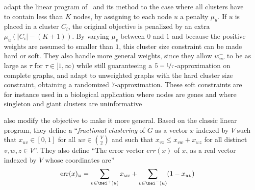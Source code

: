 \Textcite{Puleo2014} adapt the linear program of~\autocite{Charikar2003} and its \regionGrow{}
method to the case
where all clusters have to contain less than $K$ nodes, by assigning to each node $u$ a penalty
$\mu_u$. If $u$ is placed in a cluster $C_i$, the original \mind{} objective is penalized by an
extra $\mu_u\left(|C_i| - (K+1)\right)$. By varying $\mu_v$ between $0$ and $1$ and because the
positive weights are assumed to smaller than $1$, this cluster size constraint can be made hard or
soft. They also handle more general weights, since they allow $w^-_{uv}$ to be as large as $\tau$
for $\tau\in [1,\infty)$ while still guaranteeing a $5-\nicefrac{1}{\tau}$-approximation on complete
graphs, and adapt \ccpivot{} to unweighted graphs with the hard cluster size constraint, obtaining a
randomized $7$-approximation.
These soft constraints are for instance used in a biological application where nodes are genes and
where singleton and giant clusters are uninformative~\autocite{Hou2016}

\Textcite{pmlr-v48-puleo16} also modify the \mind{} objective to make it more general. Based on the
classic \pcc{} linear program, they define a \enquote{\emph{fractional clustering} of $G$ as a
vector $x$ indexed by $V$ such that $x_{uv} \in [0, 1]$ for all $uv \in \binom{V}{2}$ and such that
$x_{vz} \leq x_{vw} + x_{wz}$ for all distinct $v, w, z \in V$}. They also define \enquote{The
error vector $err(x)$ of $x$, as a real vector indexed by $V$ whose coordinates are}
\begin{equation*}
  \mathrm{err}(x)_u = \sum_{v\in\nei^+(u)} x_{uv} + \sum_{v\in\nei^-(u)} (1-x_{uv})
\end{equation*}


